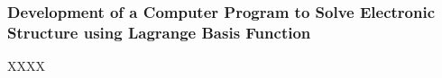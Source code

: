\documentclass{beamer}
\begin{document}
\begin{frame}
\frametitle{Development of a Computer Program to Solve Electronic Structure using
Lagrange Basis Function}

XXXX

\end{frame}
\end{document}
